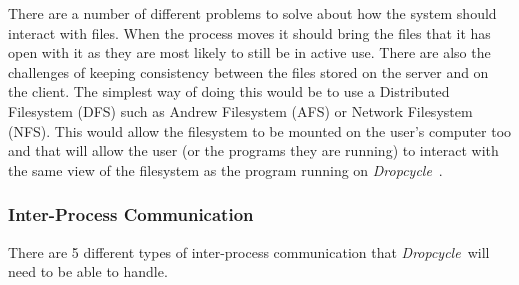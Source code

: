 \documentclass[12pt, a4paper]{article}
\def\dropcycle{\emph{Dropcycle}\ }
\begin{document}
There are a number of different problems to solve about how the system should
interact with files. When the process moves it should bring the files that it
has open with it as they are most likely to still be in active use. There are
also the challenges of keeping consistency between the files stored on the
server and on the client. The simplest way of doing this would be to use
a Distributed Filesystem (DFS) such as Andrew Filesystem (AFS) or Network
Filesystem (NFS). This would allow the filesystem to be mounted on the user's
computer too and that will allow the user (or the programs they are running) to
interact with the same view of the filesystem as the program running on
\dropcycle.

\subsubsection{Inter-Process Communication}

There are 5 different types of inter-process communication that \dropcycle will
need to be able to handle.
\end{document}

